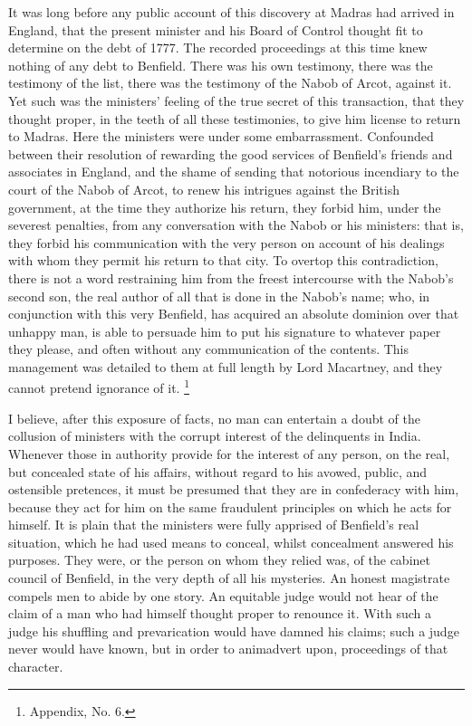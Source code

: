 It was long before any public account of this discovery at Madras had arrived in England, that the present minister and his Board of Control thought fit to determine on the debt of 1777. The recorded proceedings at this time knew nothing of any debt to Benfield. There was his own testimony, there was the testimony of the list, there was the testimony of the Nabob of Arcot, against it. Yet such was the ministers' feeling of the true secret of this transaction, that they thought proper, in the teeth of all these testimonies, to give him license to return to Madras. Here the ministers were under some embarrassment. Confounded between their resolution of rewarding the good services of Benfield's friends and associates in England, and the shame of sending that notorious incendiary to the court of the Nabob of Arcot, to renew his intrigues against the British government, at the time they authorize his return, they forbid him, under the severest penalties, from any conversation with the Nabob or his ministers: that is, they forbid his communication with the very person on account of his dealings with whom they permit his return to that city. To overtop this contradiction, there is not a word restraining him from the freest intercourse with the Nabob's second son, the real author of all that is done in the Nabob's name; who, in conjunction with this very Benfield, has acquired an absolute dominion over that unhappy man, is able to persuade him to put his signature to whatever paper they please, and often without any communication of the contents. This management was detailed to them at full length by Lord Macartney, and they cannot pretend ignorance of it.
\footnote{ Appendix, No. 6.}


I believe, after this exposure of facts, no man can entertain a doubt of the collusion of ministers with the corrupt interest of the delinquents in India. Whenever those in authority provide for the interest of any person, on the real, but concealed state of his affairs, without regard to his avowed, public, and ostensible pretences, it must be presumed that they are in confederacy with him, because they act for him on the same fraudulent principles on which he acts for himself. It is plain that the ministers were fully apprised of Benfield's real situation, which he had used means to conceal, whilst concealment answered his purposes. They were, or the person on whom they relied was, of the cabinet council of Benfield, in the very depth of all his mysteries. An honest magistrate compels men to abide by one story. An equitable judge would not hear of the claim of a man who had himself thought proper to renounce it. With such a judge his shuffling and prevarication would have damned his claims; such a judge never would have known, but in order to animadvert upon, proceedings of that character.

